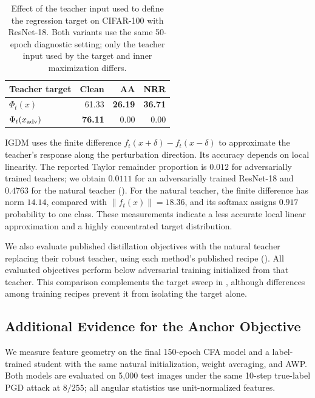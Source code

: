 \begin{table}[!htbp]
  \centering\small\setlength{\tabcolsep}{5pt}
  \caption{Effect of the teacher input used to define the regression target on
  CIFAR-100 with ResNet-18. Both variants use the same 50-epoch diagnostic
  setting; only the teacher input used by the target and inner maximization
  differs.}
  \label{tab:teacherread}
  \begin{tabular}{lrrr}
    \toprule
    Teacher target & Clean & AA & NRR \\
    \midrule
    \(\Phi_t(x)\) & 61.33 & \textbf{26.19} & \textbf{36.71} \\
    \(\Phi_t(x_{\rm adv})\) & \textbf{76.11} & 0.00 & 0.00 \\
    \bottomrule
  \end{tabular}
\end{table}

IGDM \citep{igdm} uses the finite difference $f_t(x+\delta)-f_t(x-\delta)$ to approximate the
teacher's response along the perturbation direction. Its accuracy depends on local linearity.
The reported Taylor remainder proportion is $0.012$ for adversarially trained teachers; we obtain
$0.0111$ for an adversarially trained ResNet-18 and $0.4763$ for the natural teacher
(). For the natural teacher, the finite difference has norm $14.14$, compared
with $\lVert f_t(x)\rVert=18.36$, and its softmax assigns $0.917$ probability to one class.
These measurements indicate a less accurate local linear approximation and a highly concentrated
target distribution.

We also evaluate published distillation objectives with the natural teacher replacing their robust
teacher, using each method's published recipe (). All evaluated objectives
perform below adversarial training initialized from that teacher. This comparison complements the
target sweep in , although differences among training recipes prevent it from
isolating the target alone.

\subsection{Additional Evidence for the Anchor Objective}
\label{app:anchor_measurements}
\label{sec:empirical_geometry}

We measure feature geometry on the final 150-epoch CFA model and a label-trained student with the
same natural initialization, weight averaging, and AWP. Both models are evaluated on 5,000 test
images under the same 10-step true-label PGD attack at $8/255$; all angular statistics use
unit-normalized features.

